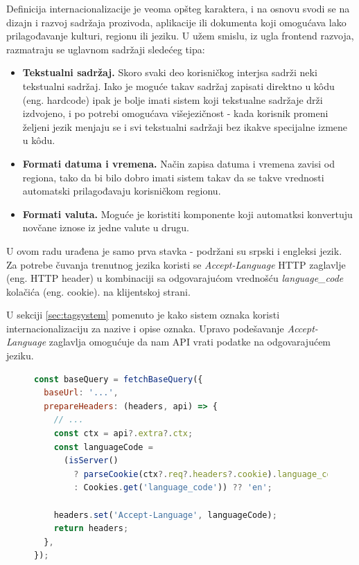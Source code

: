 \documentclass[12pt,oneside]{memoir}
\begin{document}
Definicija internacionalizacije je veoma opšteg karaktera, i na osnovu \cite{i18n} svodi se na dizajn i razvoj sadržaja prozivoda, aplikacije ili dokumenta koji omogućava lako prilagođavanje kulturi, regionu ili jeziku. U užem smislu, iz ugla frontend razvoja, razmatraju se uglavnom sadržaji sledećeg tipa:

\begin{itemize}
    \item \textbf{Tekstualni sadržaj.} Skoro svaki deo korisničkog interjsa sadrži neki tekstualni sadržaj. Iako je moguće takav sadržaj zapisati direktno u k\^{o}du (eng. hardcode) ipak je bolje imati sistem koji tekstualne sadržaje drži izdvojeno, i po potrebi omogućava višejezičnost - kada korisnik promeni željeni jezik menjaju se i svi tekstualni sadržaji bez ikakve specijalne izmene u k\^{o}du.
    \item \textbf{Formati datuma i vremena.} Način zapisa datuma i vremena zavisi od regiona, tako da bi bilo dobro imati sistem takav da se takve vrednosti automatski prilagođavaju korisničkom regionu.
    \item \textbf{Formati valuta.} Moguće je koristiti komponente koji automatksi konvertuju novčane iznose iz jedne valute u drugu.
\end{itemize}



U ovom radu urađena je samo prva stavka - podržani su srpski i engleksi jezik. Za potrebe čuvanja trenutnog jezika koristi se \textit{Accept-Language} HTTP zaglavlje (eng. HTTP header) u kombinaciji sa odgovarajućom vrednošću \textit{language\_code} kolačića (eng. cookie). na klijentskoj strani.

U sekciji \ref{sec:tagsystem} pomenuto je kako sistem oznaka koristi internacionalizaciju za nazive i opise oznaka. Upravo podešavanje \textit{Accept-Language} zaglavlja omogućuje da nam API vrati podatke na odgovarajućem jeziku.

\begin{figure}[h]
\begin{lstlisting}[language=JavaScript, style=ES6, caption={Postavljanje Accept-Language zaglavlja u RTKQ prilikom API zahteva.}]
const baseQuery = fetchBaseQuery({
  baseUrl: '...',
  prepareHeaders: (headers, api) => {
    // ...
    const ctx = api?.extra?.ctx;
    const languageCode =
      (isServer()
        ? parseCookie(ctx?.req?.headers?.cookie).language_code ?? ''
        : Cookies.get('language_code')) ?? 'en';

    headers.set('Accept-Language', languageCode);
    return headers;
  },
});
\end{lstlisting}
\end{figure}
\end{document}
